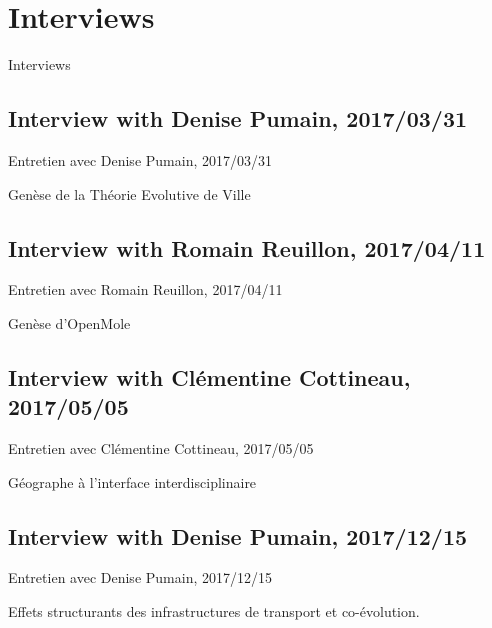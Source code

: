 






\section{Interviews}{Interviews}

\label{app:sec:interviews}



\subsection{Interview with Denise Pumain, 2017/03/31}{Entretien avec Denise Pumain, 2017/03/31}

Genèse de la Théorie Evolutive de Ville

\subsection{Interview with Romain Reuillon, 2017/04/11}{Entretien avec Romain Reuillon, 2017/04/11}

Genèse d'OpenMole

\subsection{Interview with Clémentine Cottineau, 2017/05/05}{Entretien avec Clémentine Cottineau, 2017/05/05}

Géographe à l'interface interdisciplinaire




\subsection{Interview with Denise Pumain, 2017/12/15}{Entretien avec Denise Pumain, 2017/12/15}

Effets structurants des infrastructures de transport et co-évolution.











